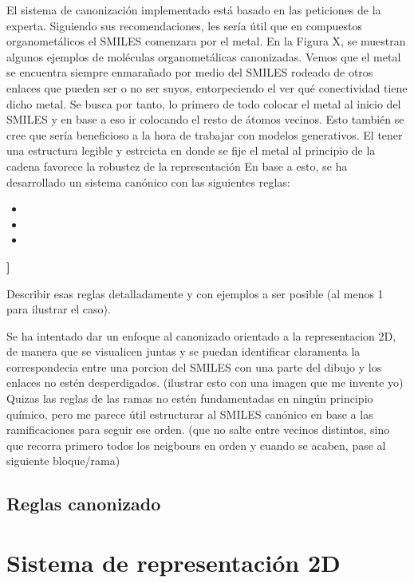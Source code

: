 El sistema de canonización implementado está basado en las peticiones de la experta. Siguiendo sus recomendaciones, les sería útil que en compuestos organometálicos el SMILES comenzara por el metal. En la Figura X, se muestran algunos ejemplos de moléculas organometálicas canonizadas. Vemos que el metal se encuentra siempre enmarañado por medio del SMILES rodeado de otros enlaces que pueden ser o no ser suyos, entorpeciendo el ver qué conectividad tiene dicho metal. Se busca por tanto, lo primero de todo colocar el metal al inicio del SMILES y en base a eso ir colocando el resto de átomos vecinos. Esto también se cree que sería beneficioso a la hora de trabajar con modelos generativos. El tener una estructura legible y estrcicta en donde se fije el metal al principio de la cadena favorece la robustez de la representación \cite{SELFIES, krenn_self_referencing_2020}
En base a esto, se ha desarrollado un sistema canónico con las siguientes reglas:
\begin{itemize}
    \item 
    \item 
    \item 
\end{itemize}
\textbf{]}

Describir esas reglas detalladamente y con ejemplos a ser posible (al menos 1 para ilustrar el caso).

Se ha intentado dar un enfoque al canonizado orientado a la representacion 2D, de manera que se visualicen juntas y se puedan identificar claramenta la correspondecia entre una porcion del SMILES con una parte del dibujo y los enlaces no estén desperdigados. (ilustrar esto con una imagen que me invente yo) Quizas las reglas de las ramas no estén fundamentadas en ningún principio químico, pero me parece útil estructurar al SMILES canónico en base a las ramificaciones para seguir ese orden. (que no salte entre vecinos distintos, sino que recorra primero todos los neigbours en orden y cuando se acaben, pase al siguiente bloque/rama)


\subsection{Reglas canonizado} \label{reglas_canonizado}


\section{Sistema de representación 2D} \label{implementacion:dibujado}

